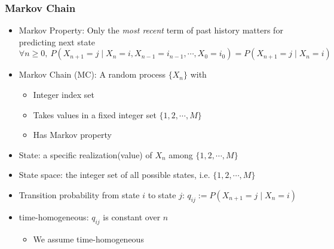 \subsubsection*{Markov Chain}
\begin{itemize}
    \item Markov Property: Only the \textit{most recent} term of past history matters for predicting next state
    \begin{equation}
        \forall n\geq 0,~P(X_{n+1}=j\mid X_n=i,X_{n-1}=i_{n-1},\cdots,X_0=i_0)=P(X_{n+1}=j\mid X_n=i)
    \end{equation}
    \clearpage
    \item Markov Chain (MC): A random process $\{X_n\}$ with
    \begin{itemize}
        \item Integer index set
        \item Takes values in a fixed integer set $\{1,2,\cdots,M\}$
        \item Has Markov property
    \end{itemize}
    \item State: a specific realization(value) of $X_n$ among $\{1,2,\cdots,M\}$
    \item State space: the integer set of all possible states, i.e. $\{1,2,\cdots,M\}$
    \item Transition probability from state $i$ to state $j$: $q_{ij}:=P(X_{n+1}=j\mid X_n=i)$
    \item time-homogeneous: $q_{ij}$ is constant over $n$
    \begin{itemize}
        \item We assume time-homogeneous
    \end{itemize}
\end{itemize}

